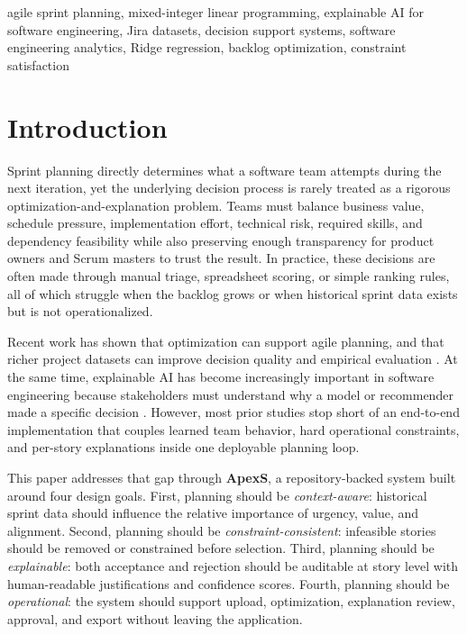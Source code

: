 \documentclass[conference]{IEEEtran}
\begin{document}
\begin{IEEEkeywords}
agile sprint planning, mixed-integer linear programming, explainable AI for
software engineering, Jira datasets, decision support systems, software engineering
analytics, Ridge regression, backlog optimization, constraint satisfaction
\end{IEEEkeywords}

\section{Introduction}
\label{sec:intro}

Sprint planning directly determines what a software team attempts during the next
iteration, yet the underlying decision process is rarely treated as a rigorous
optimization-and-explanation problem.
Teams must balance business value, schedule pressure, implementation effort,
technical risk, required skills, and dependency feasibility while also preserving
enough transparency for product owners and Scrum masters to trust the result.
In practice, these decisions are often made through manual triage, spreadsheet
scoring, or simple ranking rules, all of which struggle when the backlog grows or
when historical sprint data exists but is not operationalized.

Recent work has shown that optimization can support agile planning, and that richer
project datasets can improve decision quality and empirical evaluation
\cite{ase2024, agile-mo, tawos, jira-dataset}.
At the same time, explainable AI has become increasingly important in software
engineering because stakeholders must understand why a model or recommender made a
specific decision \cite{xai-slr-se, xai-survey, explanation-matters}.
However, most prior studies stop short of an end-to-end implementation that couples
learned team behavior, hard operational constraints, and per-story explanations
inside one deployable planning loop.

This paper addresses that gap through \textbf{ApexS}, a repository-backed system
built around four design goals.
First, planning should be \emph{context-aware}: historical sprint data should
influence the relative importance of urgency, value, and alignment.
Second, planning should be \emph{constraint-consistent}: infeasible stories should
be removed or constrained before selection.
Third, planning should be \emph{explainable}: both acceptance and rejection should
be auditable at story level with human-readable justifications and confidence
scores.
Fourth, planning should be \emph{operational}: the system should support upload,
optimization, explanation review, approval, and export without leaving the
application.
\end{document}
